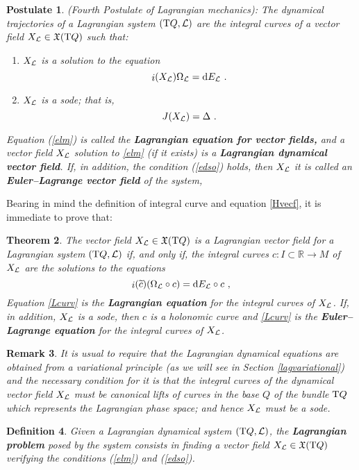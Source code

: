 \documentclass[12pt]{report}
\newtheorem{teor}{Theorem}[chapter]
\newtheorem{definition}[teor]{Definition}
\newtheorem{remark}[teor]{Remark}
\newtheorem{pos}[teor]{Postulate}
\def\beq{\begin{equation}}
\def\eeq{\end{equation}}
\def\ben{\begin{enumerate}}
\def\een{\end{enumerate}}
\def\vf{\mathfrak X}
\def\Lag{{\cal L}}
\def\d{{\rm d}}
\def\Real{\mathbb{R}}
\def\Tan{{\rm T}}
\def\inn{\mathop{i}\nolimits}
\begin{document}
\begin{pos}
\label{4poslag}
{\rm (Fourth Postulate of Lagrangian mechanics\/)}:
The dynamical trajectories of a Lagrangian system
$(\Tan Q,\Lag)$ are the integral curves
of a vector field $X_\Lag \in \vf (\Tan Q)$ such that:
\ben
\item
$X_\Lag$ is a solution to the equation
\beq
\inn (X_\Lag )\Omega_\Lag = \d E_\Lag \ .
\label{elm}
\eeq
\item
$X_\Lag$ is a {\sc sode}; that is, 
\beq
J (X_\Lag ) = \Delta \ .
\label{edso}
\eeq
\een
Equation (\ref{elm}) is called the
 \textbf{Lagrangian equation for vector fields,} and
a vector field $X_\Lag$ solution to \eqref{elm} (if it exists) is a
\textbf{Lagrangian dynamical vector field}.
If, in addition, the condition (\ref{edso}) holds, then
$X_\Lag$ it is called an \textbf{Euler--Lagrange vector field} of the system, 
\end{pos}

Bearing in mind the definition of integral curve and equation  \eqref{Hvecf},
it is immediate to prove that:

\begin{teor}
\label{teor:Lcurv}
The vector field $X_\Lag\in\vf(\Tan Q)$ is a Lagrangian vector field for a
Lagrangian system $(\Tan Q,\Lag)$ if, and only if,
the integral curves $c\colon I\subset\Real\to M$ of $X_\Lag$ are the solutions to the equations
 \begin{equation}
\label{Lcurv}
\inn( \widetilde c)(\Omega_\Lag\circ c)=\d E_\Lag\circ c \ ,
\eeq
Equation \eqref{Lcurv} is the \textbf{Lagrangian equation} for the
integral curves of $X_\Lag$.
If, in addition, $X_\Lag$ is a {\sc sode}, then $c$ is a holonomic curve
and \eqref{Lcurv} is the
\textbf{Euler--Lagrange equation} for the integral curves of $X_\Lag$.
\end{teor}

\begin{remark}{\rm 
It is usual to require that the Lagrangian dynamical equations are
obtained from a variational principle (as we will see
in Section \ref{lagvariational}) and
the necessary condition for it is that the integral curves
of the dynamical vector field $X_\Lag$ must be canonical lifts of
curves in the base $Q$ of the bundle $\Tan Q$ which represents the
Lagrangian phase space; and hence $X_\Lag$ must be a {\sc sode}.
}\end{remark}

\begin{definition}
Given a Lagrangian dynamical system $(\Tan Q,\Lag )$, 
the \textbf{Lagrangian problem} posed by  the system
consists in finding a vector field $X_\Lag \in \vf (\Tan Q)$
verifying  the conditions (\ref{elm}) and (\ref{edso}).
\end{definition}
\end{document}
